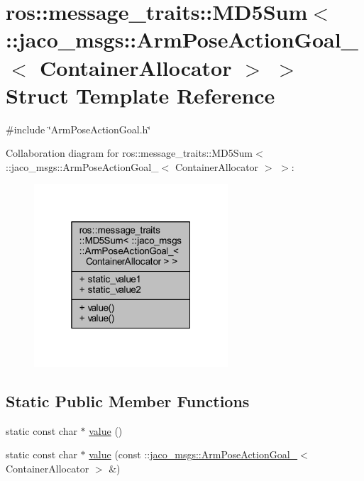 \hypertarget{structros_1_1message__traits_1_1MD5Sum_3_01_1_1jaco__msgs_1_1ArmPoseActionGoal___3_01ContainerAllocator_01_4_01_4}{}\section{ros\+:\+:message\+\_\+traits\+:\+:M\+D5\+Sum$<$ \+:\+:jaco\+\_\+msgs\+:\+:Arm\+Pose\+Action\+Goal\+\_\+$<$ Container\+Allocator $>$ $>$ Struct Template Reference}
\label{structros_1_1message__traits_1_1MD5Sum_3_01_1_1jaco__msgs_1_1ArmPoseActionGoal___3_01ContainerAllocator_01_4_01_4}


{\ttfamily \#include \char`\"{}Arm\+Pose\+Action\+Goal.\+h\char`\"{}}



Collaboration diagram for ros\+:\+:message\+\_\+traits\+:\+:M\+D5\+Sum$<$ \+:\+:jaco\+\_\+msgs\+:\+:Arm\+Pose\+Action\+Goal\+\_\+$<$ Container\+Allocator $>$ $>$\+:
\nopagebreak
\begin{figure}[H]
\begin{center}
\leavevmode
\includegraphics[width=205pt]{d5/dcb/structros_1_1message__traits_1_1MD5Sum_3_01_1_1jaco__msgs_1_1ArmPoseActionGoal___3_01ContainerAllocator_01_4_01_4__coll__graph}
\end{center}
\end{figure}
\subsection*{Static Public Member Functions}
\begin{DoxyCompactItemize}
\item 
static const char $\ast$ \hyperlink{structros_1_1message__traits_1_1MD5Sum_3_01_1_1jaco__msgs_1_1ArmPoseActionGoal___3_01ContainerAllocator_01_4_01_4_a401d0b5aaa6495cf2d8b2e566e810859}{value} ()
\item 
static const char $\ast$ \hyperlink{structros_1_1message__traits_1_1MD5Sum_3_01_1_1jaco__msgs_1_1ArmPoseActionGoal___3_01ContainerAllocator_01_4_01_4_adc2d3db30fc9310ae6c84f24d76b5bc8}{value} (const \+::\hyperlink{structjaco__msgs_1_1ArmPoseActionGoal__}{jaco\+\_\+msgs\+::\+Arm\+Pose\+Action\+Goal\+\_\+}$<$ Container\+Allocator $>$ \&)
\end{DoxyCompactItemize}
